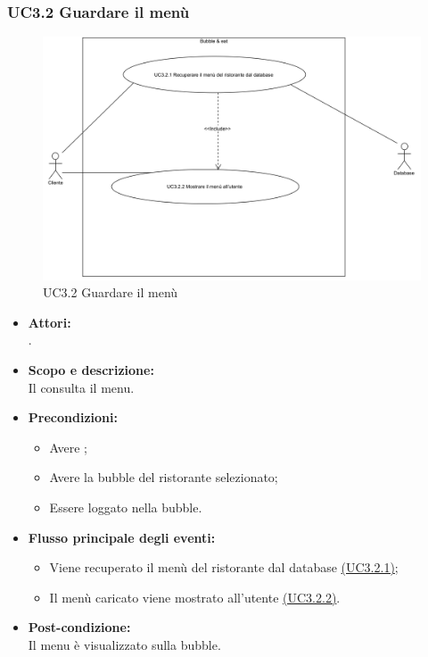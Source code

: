 \subsubsection{UC3.2 Guardare il menù} \label{UC3.2}

\begin{figure}[H]
	\centering
	\includegraphics[width=15cm]{../../documenti/AnalisiDeiRequisiti/Diagrammi_img/uc3_2.png}
	\caption{UC3.2 Guardare il menù}
\end{figure}

\begin{itemize}
	\item \textbf{Attori:}
	\\.
	\item \textbf{Scopo e descrizione:} 
	\\Il {} consulta il menu.
	\item \textbf{Precondizioni:}
	\begin{itemize}
		\item Avere ;
		\item Avere la bubble del ristorante selezionato;
		\item Essere loggato nella bubble.
	\end{itemize}
	\item \textbf{Flusso principale degli eventi:}
	\begin{itemize}
		\item Viene recuperato il menù del ristorante dal database \hyperref[UC3.2.1]{(UC3.2.1)};
		\item Il menù caricato viene mostrato all’utente \hyperref[UC3.2.2]{(UC3.2.2)}.
	\end{itemize}
	\item \textbf{Post-condizione:}
	\\Il menu è visualizzato sulla bubble.
\end{itemize}

